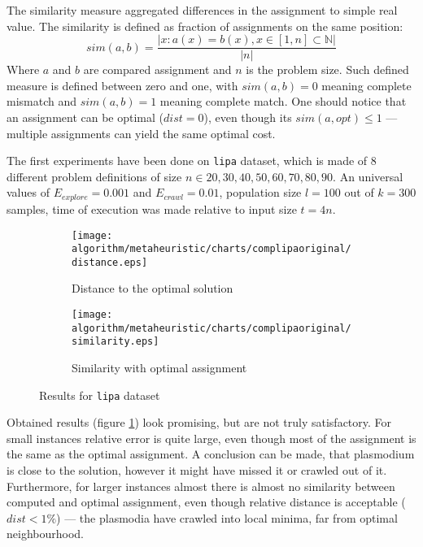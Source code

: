 The similarity measure aggregated differences in the assignment to simple real value. The similarity is defined as fraction of assignments on the same position:
\begin{equation}
  sim(a, b) = \frac{| x : a(x) = b(x), x \in [1, n] \subset \mathbb{N}|}{|n|}
\end{equation}
Where $a$ and $b$ are compared assignment and $n$ is the problem size. Such defined measure is defined between zero and one, with $sim(a, b) = 0$ meaning complete mismatch and $sim(a, b) = 1$ meaning complete match. One should notice that an assignment can be optimal ($dist=0$), even though its $sim(a, opt) \leq 1$ --- multiple assignments can yield the same optimal cost.

The first experiments have been done on \texttt{lipa} dataset, which is made of 8 different problem definitions of size $n \in {20, 30, 40, 50, 60, 70, 80, 90}$. An universal values of $E_{explore}=0.001$ and $E_{crawl}=0.01$, population size $l=100$ out of $k=300$ samples, time of execution was made relative to input size $t=4n$.

\begin{figure}
  \centering

  \begin{subfigure}{0.47\textwidth}
    \texttt{[image: algorithm/metaheuristic/charts/complipaoriginal/distance.eps]}
    \caption{Distance to the optimal solution}
  \end{subfigure}
  \begin{subfigure}{0.47\textwidth}
    \texttt{[image: algorithm/metaheuristic/charts/complipaoriginal/similarity.eps]}
    \caption{Similarity with optimal assignment}
  \end{subfigure}
  
  \caption{Results for \texttt{lipa} dataset}
  \label{figure:am_lipa_results}
\end{figure}

Obtained results (figure \ref{figure:am_lipa_results}) look promising, but are not truly satisfactory. For small instances relative error is quite large, even though most of the assignment is the same as the optimal assignment. A conclusion can be made, that plasmodium is close to the solution, however it might have missed it or crawled out of it. Furthermore, for larger instances almost there is almost no similarity between computed and optimal assignment, even though relative distance is acceptable ($dist < 1\%$) --- the plasmodia have crawled into local minima, far from optimal neighbourhood.

